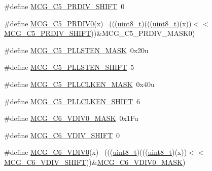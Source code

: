 \begin{DoxyCompactItemize}
\item 
\#define \hyperlink{group___m_c_g___register___masks_ga365043bcc722b49ba0304f9f0ddc2ba6}{M\+C\+G\+\_\+\+C5\+\_\+\+P\+R\+D\+I\+V\+\_\+\+S\+H\+I\+FT}~0
\item 
\#define \hyperlink{group___m_c_g___register___masks_gaafae1346cb61ccf99320c05d4fe51ae9}{M\+C\+G\+\_\+\+C5\+\_\+\+P\+R\+D\+I\+V0}(x)                                                ~(((\hyperlink{_p_e___types_8h_aba7bc1797add20fe3efdf37ced1182c5}{uint8\+\_\+t})(((\hyperlink{_p_e___types_8h_aba7bc1797add20fe3efdf37ced1182c5}{uint8\+\_\+t})(x))$<$$<$\hyperlink{group___m_c_g___register___masks_ga365043bcc722b49ba0304f9f0ddc2ba6}{M\+C\+G\+\_\+\+C5\+\_\+\+P\+R\+D\+I\+V\+\_\+\+S\+H\+I\+FT}))\&M\+C\+G\+\_\+\+C5\+\_\+\+P\+R\+D\+I\+V\+\_\+\+M\+A\+S\+K0)
\item 
\#define \hyperlink{group___m_c_g___register___masks_ga6e9012fb4771631696eb261b34130e31}{M\+C\+G\+\_\+\+C5\+\_\+\+P\+L\+L\+S\+T\+E\+N\+\_\+\+M\+A\+SK}~0x20u
\item 
\#define \hyperlink{group___m_c_g___register___masks_gaa66818d3e9c0aa682bf5f7612459ca23}{M\+C\+G\+\_\+\+C5\+\_\+\+P\+L\+L\+S\+T\+E\+N\+\_\+\+S\+H\+I\+FT}~5
\item 
\#define \hyperlink{group___m_c_g___register___masks_gaa5b6c4dbca228be833310a8c24e39796}{M\+C\+G\+\_\+\+C5\+\_\+\+P\+L\+L\+C\+L\+K\+E\+N\+\_\+\+M\+A\+SK}~0x40u
\item 
\#define \hyperlink{group___m_c_g___register___masks_ga2e6e280569083cbd612cde3d62993cec}{M\+C\+G\+\_\+\+C5\+\_\+\+P\+L\+L\+C\+L\+K\+E\+N\+\_\+\+S\+H\+I\+FT}~6
\item 
\#define \hyperlink{group___m_c_g___register___masks_gacf93ac207865bd372d9148f10dce7267}{M\+C\+G\+\_\+\+C6\+\_\+\+V\+D\+I\+V0\+\_\+\+M\+A\+SK}~0x1\+Fu
\item 
\#define \hyperlink{group___m_c_g___register___masks_ga37d60fb1c50e4115132f9154b33c8b75}{M\+C\+G\+\_\+\+C6\+\_\+\+V\+D\+I\+V\+\_\+\+S\+H\+I\+FT}~0
\item 
\#define \hyperlink{group___m_c_g___register___masks_gaac5b6e92ac0ca98d1feadbf5d6ce2159}{M\+C\+G\+\_\+\+C6\+\_\+\+V\+D\+I\+V0}(x)                                                  ~(((\hyperlink{_p_e___types_8h_aba7bc1797add20fe3efdf37ced1182c5}{uint8\+\_\+t})(((\hyperlink{_p_e___types_8h_aba7bc1797add20fe3efdf37ced1182c5}{uint8\+\_\+t})(x))$<$$<$\hyperlink{group___m_c_g___register___masks_ga37d60fb1c50e4115132f9154b33c8b75}{M\+C\+G\+\_\+\+C6\+\_\+\+V\+D\+I\+V\+\_\+\+S\+H\+I\+FT}))\&\hyperlink{group___m_c_g___register___masks_gacf93ac207865bd372d9148f10dce7267}{M\+C\+G\+\_\+\+C6\+\_\+\+V\+D\+I\+V0\+\_\+\+M\+A\+SK})

\end{DoxyCompactItemize}
